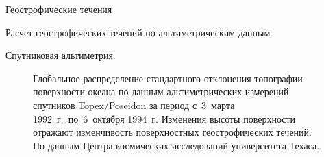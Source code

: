 \begin{chapter}{Геострофические течения}
\begin{section}{Расчет геострофических течений по альтиметрическим данным}
\begin{paragraph}{Спутниковая альтиметрия.}
\begin{figure}[t!]
\caption{Глобальное распределение стандартного отклонения топографии
поверхности океана по данным альтиметрических измерений
спутников Topex/Poseidon
за период с~3~марта 1992~г.\ по~6~октября 1994~г. 
Изменения высоты поверхности отражают изменчивость поверхностных
геострофических течений. 
По данным Центра космических исследований университета Техаса.}
\label{fig:sshvariability}
\end{figure}
%


\end{paragraph}
\end{section}
\end{chapter}
